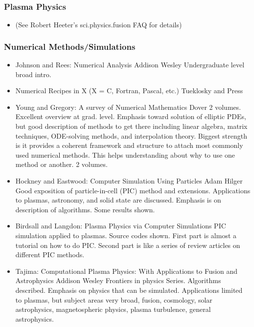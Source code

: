 \documentclass[10pt,a4paper]{book}
\theoremstyle{definition}
\begin{document}
\subsubsection{Plasma Physics}
\begin{itemize}
\item (See Robert Heeter's sci.physics.fusion FAQ for details)
\end{itemize}



\subsubsection{Numerical Methods/Simulations}
\begin{itemize}
\item Johnson and Rees: Numerical Analysis Addison Wesley
Undergraduate level broad intro.
\item Numerical Recipes in X (X = C, Fortran, Pascal, etc.) Tueklosky and Press
\item Young and Gregory: A survey of Numerical Mathematics Dover 2 volumes.
Excellent overview at grad. level.  Emphasis toward solution of elliptic PDEs, but good description of methods to get there including linear algebra, matrix techniques, ODE-solving methods, and interpolation theory.  Biggest strength is it provides a coherent framework and structure to attach most commonly used numerical methods.  This helps understanding about why to use one method or another.  2 volumes.
\item Hockney and Eastwood: Computer Simulation Using Particles Adam Hilger
Good exposition of particle-in-cell (PIC) method and extensions.  Applications to plasmas, astronomy, and solid state are discussed.  Emphasis is on description of algorithms.  Some results shown.
\item Birdsall and Langdon: Plasma Physics via Computer Simulations
PIC simulation applied to plasmas.  Source codes shown.  First part is almost a tutorial on how to do PIC.  Second part is like a series of review articles on different PIC methods.
\item Tajima: Computational Plasma Physics: With Applications to Fusion and Astrophysics Addison Wesley Frontiers in physics Series.
Algorithms described.  Emphasis on physics that can be simulated.  Applications limited to plasmas, but subject areas very broad, fusion, cosmology, solar astrophysics, magnetospheric physics, plasma turbulence, general astrophysics.
\end{itemize}
\end{document}
